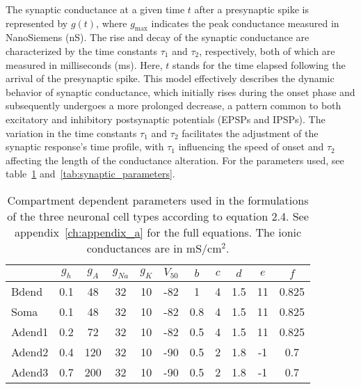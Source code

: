 The synaptic conductance at a given time \(t\) after a presynaptic spike is represented by \(g(t)\), where \(g_{\text{max}}\) indicates the peak conductance measured in NanoSiemens (nS).
The rise and decay of the synaptic conductance are characterized by the time constants \(\tau_1\) and \(\tau_2\), respectively, both of which are measured in milliseconds (ms).
Here, \(t\) stands for the time elapsed following the arrival of the presynaptic spike.
This model effectively describes the dynamic behavior of synaptic conductance, which initially rises during the onset phase and subsequently undergoes a more prolonged decrease, a pattern common to both excitatory and inhibitory postsynaptic potentials (EPSPs and IPSPs).
The variation in the time constants \(\tau_1\) and \(\tau_2\) facilitates the adjustment of the synaptic response's time profile, with \(\tau_1\) influencing the speed of onset and \(\tau_2\) affecting the length of the conductance alteration.
For the parameters used, see table~\ref{table:compartment_dependent_parameters} and~\ref{tab:synaptic_parameters}.
\begin{table}[htbp]
    \centering
    \caption[Compartment dependent parameters]{Compartment dependent parameters used in the formulations of the three neuronal cell types according to equation 2.4.
        See appendix~\ref{ch:appendix_a} for the full equations.
        The ionic conductances are in mS/cm\(^2\).}\label{table:compartment_dependent_parameters}
    \begin{tabular}{l|cccccccccc}
        \hline
        \hline
               & \( g_{h} \) & \( g_{A} \) & \( g_{Na} \) & \( g_{K} \) & \( V_{50} \) & \( b \) & \( c \) & \( d \) & \( e \) & \( f \) \\
        \hline
        Bdend  & 0.1         & 48          & 32           & 10          & -82          & 1       & 4       & 1.5     & 11      & 0.825   \\
        Soma   & 0.1         & 48          & 32           & 10          & -82          & 0.8     & 4       & 1.5     & 11      & 0.825   \\
        Adend1 & 0.2         & 72          & 32           & 10          & -82          & 0.5     & 4       & 1.5     & 11      & 0.825   \\
        Adend2 & 0.4         & 120         & 32           & 10          & -90          & 0.5     & 2       & 1.8     & -1      & 0.7     \\
        Adend3 & 0.7         & 200         & 32           & 10          & -90          & 0.5     & 2       & 1.8     & -1      & 0.7     \\
        \hline
        \hline
    \end{tabular}
\end{table}
\pagebreak

